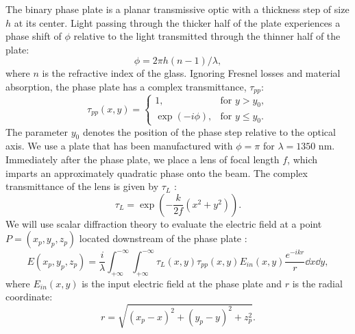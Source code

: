 The binary phase plate is a planar transmissive optic with a thickness step of size $h$ at its center. Light passing through the thicker half of the plate experiences a phase shift of $\phi$ relative to the light transmitted through the thinner half of the plate:
\begin{equation}
\phi = 2 \pi h (n-1)/\lambda,
\end{equation}
where $n$ is the refractive index of the glass. Ignoring Fresnel losses and material absorption, the phase plate has a complex transmittance, $\tau_{pp}$:
\begin{equation}
\tau_{pp} (x, y) =  \begin{cases}
1, & \textrm{for $y > y_0$},\\
\exp (-i \phi), & \textrm{for $y \le y_0$}.
\end{cases}
\label{eqn:phase-plate-transmission}
\end{equation}
The parameter $y_0$ denotes the position of the phase step relative to the optical axis. We use a plate that has been manufactured with $\phi=\pi$ for $\lambda = 1350 \textrm{ nm}$. Immediately after the phase plate, we place a lens of focal length $f$, which imparts an approximately quadratic phase onto the beam. The complex transmittance of the lens is given by $\tau_L$ \cite{goodmanIntroductionFourierOptics1996}:
\begin{equation}
\tau_L = \exp \left( - \frac{k}{2 f} (x^2 + y^2) \right).
\label{eqn:complex_transmittance_lens}
\end{equation}
We will use scalar diffraction theory to evaluate the electric field at a point $P=(x_p, y_p, z_p)$ located downstream of the phase plate \cite{passillySimpleInterferometricTechnique2005}:
\begin{equation}
E(x_p, y_p, z_p) = \frac{i}{\lambda} \int_{+ \infty}^{- \infty} \int_{+ \infty}^{- \infty} \tau_{L} (x,y) \tau_{pp} (x,y) E_{in} (x,y) \frac{e^{-i k r}}{r} \dd{x} \dd{y},
\label{eqn:diffraction_integral}
\end{equation}
where $E_{in}(x,y)$ is the input electric field at the phase plate and $r$ is the radial coordinate:
$$
r = \sqrt{(x_p-x)^2 + (y_p-y)^2 + z_p^2}.
$$

